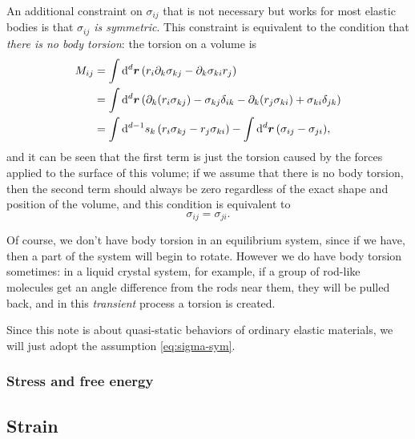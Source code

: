 \documentclass[hyperref, a4paper]{article}
\begin{document}
An additional constraint on $\sigma_{ij}$ that is not necessary 
but works for most elastic bodies is that 
\emph{$\sigma_{ij}$ is symmetric}.
This constraint is equivalent to the condition 
that \emph{there is no body torsion}:
the torsion on a volume is 
\begin{equation}
    \begin{aligned}
        M_{ij} &= \int \dd[d]{\vb*{r}} 
        \left(
            r_i \partial_k \sigma_{kj} - \partial_k \sigma_{ki} r_j
        \right) \\
        &= \int \dd[d]{\vb*{r}} \left(
            \partial_k(r_i \sigma_{kj}) - \sigma_{kj} \delta_{ik}
            - \partial_k (r_j \sigma_{ki}) + \sigma_{ki} \delta_{jk}
        \right) \\
        &= \int \dd[d-1]{s_k} (r_i \sigma_{kj} - r_j \sigma_{ki})
        - \int \dd[d]{\vb*{r}} (\sigma_{ij} - \sigma_{ji}),
    \end{aligned}
\end{equation}
and it can be seen that the first term is just the torsion caused 
by the forces applied to the surface of this volume;
if we assume that there is no body torsion,
then the second term should always be zero regardless 
of the exact shape and position of the volume,
and this condition is equivalent to 
\begin{equation}
    \sigma_{ij} = \sigma_{ji}.
    \label{eq:sigma-sym}
\end{equation}

Of course, we don't have body torsion in an equilibrium system,
since if we have, 
then a part of the system will begin to rotate.
However we do have body torsion sometimes: 
in a liquid crystal system, for example, 
if a group of rod-like molecules get an angle difference 
from the rods near them,
they will be pulled back, 
and in this \emph{transient} process a torsion is created.

Since this note is about quasi-static behaviors of ordinary elastic materials,
we will just adopt the assumption \eqref{eq:sigma-sym}.

\subsubsection{Stress and free energy}



\subsection{Strain}
\end{document}
